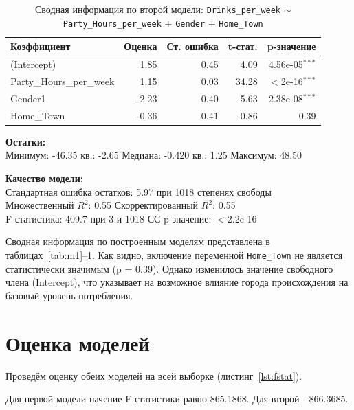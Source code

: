 \begin{table}[h]
	\centering
	\caption{Сводная информация по второй модели: \texttt{Drinks\_per\_week} $\sim$ \texttt{Party\_Hours\_per\_week} + \texttt{Gender} + \texttt{Home\_Town}}
	\begin{tabular}{lrrrr}
		\hline
		\textbf{Коэффициент} & \textbf{Оценка} & \textbf{Ст. ошибка} & \textbf{t-стат.} & \textbf{p-значение} \\
		\hline
		(Intercept)             & 1.85  & 0.45 & 4.09  & 4.56e-05$^{***}$ \\
		Party\_Hours\_per\_week & 1.15  & 0.03 & 34.28 & $<$2e-16$^{***}$ \\
		Gender1                 & -2.23 & 0.40 & -5.63 & 2.38e-08$^{***}$ \\
		Home\_Town              & -0.36 & 0.41 & -0.86 & 0.39 \\
		\hline
	\end{tabular}
	\vspace{0.5em}
	
	\textbf{Остатки:} \\
	Минимум: -46.35  кв.: -2.65 \quad Медиана: -0.420  кв.: 1.25 \quad Максимум: 48.50
	
	\vspace{0.5em}
	\textbf{Качество модели:} \\
	Стандартная ошибка остатков: 5.97 при 1018 степенях свободы \\
	Множественный $R^2$: 0.55 \quad Скорректированный $R^2$: 0.55 \\
	F-статистика: 409.7 при 3 и 1018 СС \quad p-значение: $<$2.2e-16
	\label{tab:m2}
\end{table}

Сводная информация по построенным моделям представлена в таблицах~\ref{tab:m1}--\ref{tab:m2}. Как видно, включение переменной \texttt{Home\_Town} не является статистически значимым (p = 0.39). Однако изменилось значение свободного члена (Intercept), что указывает на возможное влияние города происхождения на базовый уровень потребления.

\section{Оценка моделей}

Проведём оценку обеих моделей на всей выборке (листинг~\ref{lst:fstat}).


Для первой модели начение F-статистики \cite{wapnick2009} равно 865.1868. Для второй - 866.3685.

